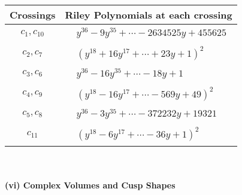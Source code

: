 \documentclass[1p]{elsarticle_modified}
\theoremstyle{definition}
\begin{document}
\begin{tabular}{m{50pt}|m{274pt}}
Crossings & \hspace{64pt}Riley Polynomials at each crossing \\
\hline $$\begin{aligned}c_{1},c_{10}\end{aligned}$$&$\begin{aligned}
&y^{36}-9 y^{35}+\cdots-2634525 y+455625
\end{aligned}$\\
\hline $$\begin{aligned}c_{2},c_{7}\end{aligned}$$&$\begin{aligned}
&(y^{18}+16 y^{17}+\cdots+23 y+1)^{2}
\end{aligned}$\\
\hline $$\begin{aligned}c_{3},c_{6}\end{aligned}$$&$\begin{aligned}
&y^{36}-16 y^{35}+\cdots-18 y+1
\end{aligned}$\\
\hline $$\begin{aligned}c_{4},c_{9}\end{aligned}$$&$\begin{aligned}
&(y^{18}-16 y^{17}+\cdots-569 y+49)^{2}
\end{aligned}$\\
\hline $$\begin{aligned}c_{5},c_{8}\end{aligned}$$&$\begin{aligned}
&y^{36}-3 y^{35}+\cdots-372232 y+19321
\end{aligned}$\\
\hline $$\begin{aligned}c_{11}\end{aligned}$$&$\begin{aligned}
&(y^{18}-6 y^{17}+\cdots-36 y+1)^{2}
\end{aligned}$\\
\hline
\end{tabular}\\~\\
\newpage\flushleft \textbf{(vi) Complex Volumes and Cusp Shapes}
\end{document}
